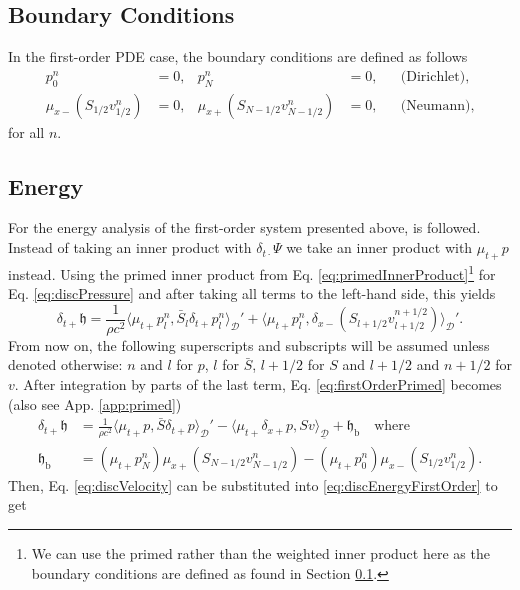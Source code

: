 \documentclass[dvipsnames]{article}
\def\dxp{\delta_{x+}}
\def\dxm{\delta_{x-}}
\def\Sbar{\bar S_l}
\begin{document}
\subsection{Boundary Conditions}\label{sec:boundariesFirstOrder}
In the first-order PDE case, the boundary conditions are defined as follows
\begin{align*}
    p_0^n &= 0, & p_N^n &= 0, & &\text{(Dirichlet),}\\
    \mu_{x-}(S_{1/2}v_{1/2}^n) &= 0, & \mu_{x+}(S_{N-1/2}v_{N-1/2}^n) &= 0, & &\text{(Neumann)},
\end{align*}
for all $n$.

\subsection{Energy}
For the energy analysis of the first-order system presented above, \cite{Harrison2018} is followed. Instead of taking an inner product with $\delta_{t\cdot}\Psi$ we take an inner product with $\mu_{t+}p$ instead. Using the primed inner product from Eq. \eqref{eq:primedInnerProduct}\footnote{We can use the primed rather than the weighted inner product here as the boundary conditions are defined as found in Section \ref{sec:boundariesFirstOrder}.} for Eq. \eqref{eq:discPressure} and after taking all terms to the left-hand side, this yields
\begin{equation}\label{eq:firstOrderPrimed}
    \delta_{t+}\mathfrak{h} = \frac{1}{\rho c^2}\langle \mu_{t+}p_l^n, \Sbar \delta_{t+}p_l^n \rangle_{\mathcal{D}}' +\langle \mu_{t+}p_l^n, \dxm(S_{l+1/2}v_{l+1/2}^{n+1/2})\rangle_{\mathcal{D}}'.
\end{equation}
From now on, the following superscripts and subscripts will be assumed unless denoted otherwise: $n$ and $l$ for $p$, $l$ for $\bar S$, $l+1/2$ for $S$ and $l+1/2$ and $n+1/2$ for $v$. After integration by parts of the last term, Eq.  \eqref{eq:firstOrderPrimed} becomes (also see App. \ref{app:primed})
\begin{align}\label{eq:discEnergyFirstOrder}
    \delta_{t+}\mathfrak{h} &= \frac{1}{\rho c^2}\langle \mu_{t+}p, \bar S \delta_{t+}p \rangle_{\mathcal{D}}' -\langle \mu_{t+}\dxp p, Sv\rangle_{\underline{\mathcal{D}}} + \mathfrak{h}_\text{b} \quad \text{where}\\
    \mathfrak{h}_\text{b} &= (\mu_{t+}p_N^n)\mu_{x+}(S_{N-1/2}v_{N-1/2}^n)-(\mu_{t+}p_0^n)\mu_{x-}(S_{1/2}v_{1/2}^n).\nonumber
\end{align}
Then, Eq. \eqref{eq:discVelocity} can be substituted into \eqref{eq:discEnergyFirstOrder} to get
\end{document}
